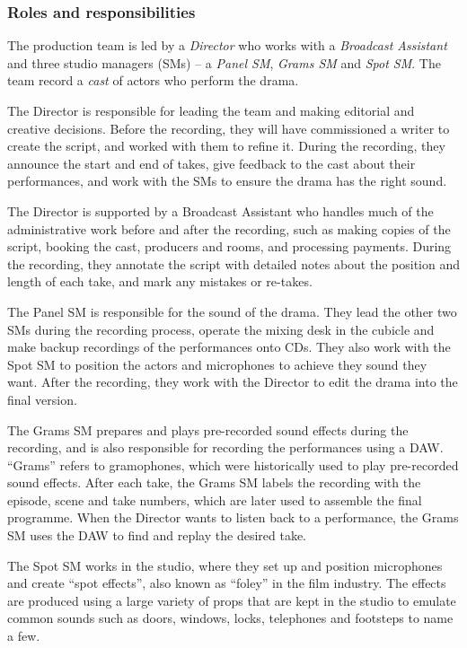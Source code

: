\subsubsection{Roles and responsibilities}
The production team is led by a \textit{Director} who works with a \textit{Broadcast Assistant} and three studio
managers (SMs) -- a \textit{Panel SM}, \textit{Grams SM} and \textit{Spot SM}. The team record a \textit{cast} of
actors who perform the drama.

The Director is responsible for leading the team and making editorial and creative decisions. Before the recording,
they will have commissioned a writer to create the script, and worked with them to refine it. During the recording,
they announce the start and end of takes, give feedback to the cast about their performances, and work with
the SMs to ensure the drama has the right sound.

The Director is supported by a Broadcast Assistant who handles much of the administrative work before and after the
recording, such as making copies of the script, booking the cast, producers and rooms, and processing payments.
During the recording, they annotate the script with detailed notes about the position and length of each take, and mark
any mistakes or re-takes.

The Panel SM is responsible for the sound of the drama. They lead the other two SMs during the recording process,
operate the mixing desk in the cubicle and make backup recordings of the performances onto CDs.  They also work with
the Spot SM to position the actors and microphones to achieve they sound they want.  After the recording, they work
with the Director to edit the drama into the final version.

The Grams SM prepares and plays pre-recorded sound effects during the recording, and is also responsible for recording
the performances using a DAW.  ``Grams'' refers to gramophones, which were historically used to play pre-recorded sound
effects.  After each take, the Grams SM labels the recording with the episode, scene and take numbers, which are later
used to assemble the final programme.  When the Director wants to listen back to a performance, the Grams SM uses the
DAW to find and replay the desired take.

The Spot SM works in the studio, where they set up and position microphones and create ``spot effects'', also known as
``foley'' in the film industry. The effects are produced using a large variety of props that are kept in the studio to
emulate common sounds such as doors, windows, locks, telephones and footsteps to name a few.

